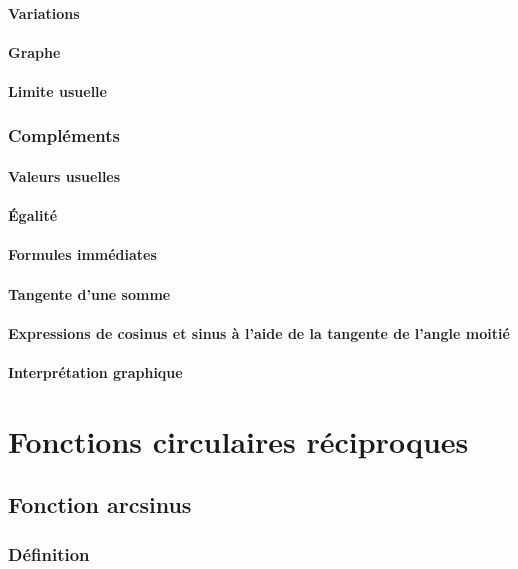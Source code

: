 \documentclass[12pt,a4paper,french]{book}
\begin{document}
			\subsubsection{Variations}
			\subsubsection{Graphe}
			\subsubsection{Limite usuelle}
		\subsection{Compléments}
			\subsubsection{Valeurs usuelles}
			\subsubsection{Égalité}
			\subsubsection{Formules immédiates}
			\subsubsection{Tangente d'une somme}
			\subsubsection{Expressions de cosinus et sinus à l'aide de la tangente de l'angle moitié}
			\subsubsection{Interprétation graphique}
			
\chapter{Fonctions circulaires réciproques}
	\section{Fonction arcsinus}
		\subsection{Définition}
\end{document}
